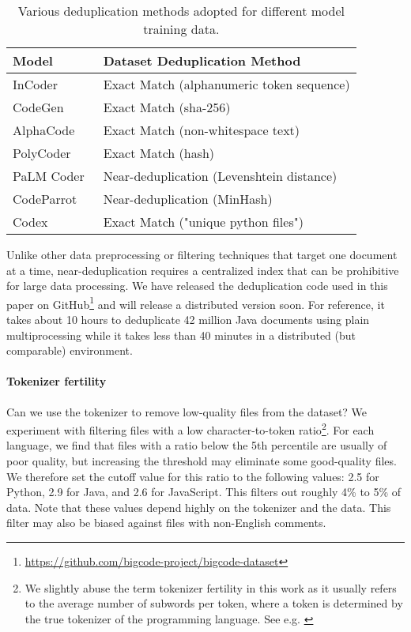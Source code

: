 \documentclass[10pt]{article} \usepackage{iclr2023_conference,times}
\begin{document}
\begin{table}[t]
\centering
\small
\begin{tabular}{ll}
\toprule
Model & Dataset Deduplication Method \\
\midrule
InCoder~\citet{fried2022incoder} & Exact Match (alphanumeric token sequence)\\
CodeGen~\citep{Nijkamp2022ACP} & Exact Match (sha-256) \\
AlphaCode~\citep{li2022competition} & Exact Match (non-whitespace text) \\
PolyCoder~\citep{10.1145/3520312.3534862} & Exact Match (hash) \\
PaLM Coder~\citep{chowdhery2022palm} & Near-deduplication (Levenshtein distance) \\
CodeParrot~\citep{Tunstall2022-nw} & Near-deduplication (MinHash) \\
Codex~\citep{chen2021codex} & Exact Match ("unique python files") \\
\bottomrule
\end{tabular}
\caption{Various deduplication methods adopted for different model training data.} 
\label{tab:dedup}
\end{table}

Unlike other data preprocessing or filtering techniques that target one document at a time, near-deduplication requires a centralized index that can be prohibitive for large data processing. We have released the deduplication code used in this paper on GitHub\footnote{\url{https://github.com/bigcode-project/bigcode-dataset}} and will release a distributed version soon. For reference, it takes about 10 hours to deduplicate 42 million Java documents using plain multiprocessing while it takes less than 40 minutes in a distributed (but comparable) environment.


\paragraph{Tokenizer fertility} Can we use the tokenizer to remove low-quality files from the dataset? We experiment with filtering files with a low character-to-token ratio\footnote{We slightly abuse the term tokenizer fertility in this work as it usually refers to the average number of subwords per token, where a token is determined by the true tokenizer of the programming language. See e.g. \citep{rust-etal-2021-good}}. For each language, we find that files with a ratio below the 5th percentile are usually of poor quality, but increasing the threshold may eliminate some good-quality files. We therefore set the cutoff value for this ratio to the following values: 2.5 for Python, 2.9 for Java, and 2.6 for JavaScript. This filters out roughly 4\% to 5\% of data. Note that these values depend highly on the tokenizer and the data. This filter may also be biased against files with non-English comments.
\end{document}
